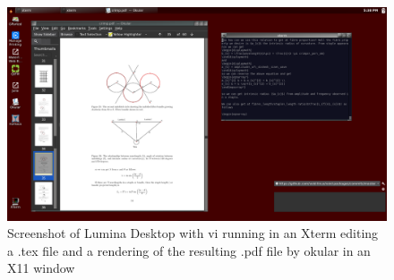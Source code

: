 %

\begin{figure}[!h]
  \centering
   \includegraphics[totalheight=3in,width=1.0\textwidth]{latex.png}
  \caption{Screenshot of Lumina Desktop with vi running in an Xterm editing a .tex file and a rendering of the resulting .pdf file  by okular in  an X11 window}
  \label{fig:latex}
\end{figure}

%

